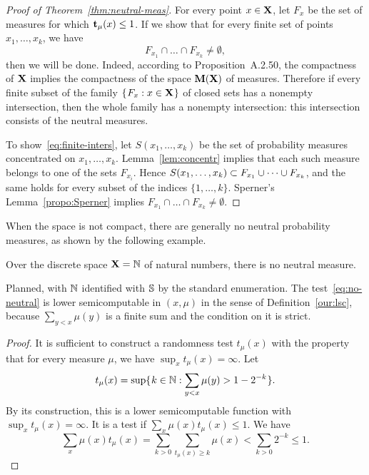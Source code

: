 \begin{proof}[Proof of Theorem~\protect\ref{thm:neutral-meas}]
  \notready
For every point \( x \in \mathbf{X} \), let \( F_{x} \) be the set of measures for which
\( \mathbf{t}_{\mu}(x) \le 1 \).
If we show that for every finite set of points \( x_{1},\dots,x_{k} \), we
have 
 \begin{equation}\label{eq:finite-inters}
  F_{x_{1}}\cap\dots\cap F_{x_{k}} \ne \emptyset,
 \end{equation}
then we will be done.
Indeed, according to Proposition~A.2.50, the compactness
of \( \mathbf{X} \) implies the compactness of the space \( \mathbf{M}(\mathbf{X}) \) of measures.
Therefore if every finite subset of the family \( \mathopen\{\mskip 1mu F_{x} : x \in \mathbf{X}\mskip 1mu\mathclose\} \)
of closed sets has a nonempty intersection, then the whole family has a
nonempty intersection: this intersection consists of the neutral
measures.

To show~\eqref{eq:finite-inters}, let \( S(x_{1},\dots,x_{k}) \) be the set of
probability measures concentrated on \( x_{1},\dots,x_{k} \).
Lemma~\ref{lem:concentr} implies that each such measure belongs to one of
the sets \( F_{x_{i}} \).
Hence \( S(x_{1},\dots,x_{k}) \subset F_{x_{1}} \cup \dots \cup F_{x_{k}} \),
and the same holds for every subset of the indices \( \{1,\dots,k\} \).
Sperner's Lemma~\ref{propo:Sperner} implies 
\( F_{x_{1}} \cap \dots \cap F_{x_{k}} \ne\emptyset \).
 \end{proof}

When the space is not compact, there are generally no neutral probability
measures, as shown by the following example.

 \begin{proposition}\label{thm:no-neutral}
Over the discrete space \( \mathbf{X} = \mathbb{N} \) of natural numbers,
there is no neutral measure.
 \end{proposition}

\begin{formalization}
Planned, with $\mathbb{N}$ identified with $\mathbb{S}$ by the standard enumeration. The test~\eqref{eq:no-neutral} is lower
semicomputable in $(x,\mu)$ in the sense of Definition~\ref{our:lsc}, because $\sum_{y<x}\mu(y)$
is a finite sum and the condition on it is strict.
\end{formalization}
 \begin{proof}
It is sufficient to 
construct a randomness test \( t_{\mu}(x) \) with the property that for
every measure \( \mu \), we have \( \sup_{x} t_{\mu}(x) = \infty \).
Let 
 \begin{equation}\label{eq:no-neutral}
   t_{\mu}(x) = \sup\mathopen\{\mskip 1mu k \in \mathbb{N}: \sum_{y<x}\mu(y) > 1-2^{-k}\mskip 1mu\mathclose\}.
 \end{equation}
By its construction, this is a lower semicomputable function with
\( \sup_{x} t_{\mu}(x) = \infty \).
It is a test if \( \sum_{x}\mu(x)t_{\mu}(x) \le 1 \).
We have
 \[
  \sum_{x} \mu(x) t_{\mu}(x) 
= \sum_{k>0} \sum_{t_{\mu}(x) \ge k} \mu(x)
< \sum_{k>0} 2^{-k} \le 1.
 \]
 \end{proof}

